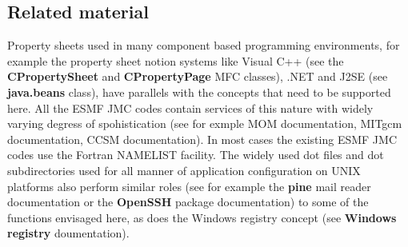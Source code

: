 \subsection{Related material}
 Property sheets used in many component based programming environments, for example
the property sheet notion  systems like Visual C++ (see the {\bf CPropertySheet} and
{\bf CPropertyPage} MFC classes), .NET and J2SE (see {\bf java.beans} class), have parallels with the concepts that need to 
be supported here. All the ESMF JMC codes contain services of this nature with widely 
varying degress of spohistication (see for exmple MOM documentation, MITgcm documentation, CCSM documentation). 
In most cases the existing ESMF JMC codes use the Fortran NAMELIST facility. The 
widely used dot files and dot subdirectories used for all manner of application configuration on UNIX 
platforms also perform similar roles (see for example the {\bf pine} mail reader
documentation or the {\bf OpenSSH} package documentation) to some of the functions envisaged here, as does the Windows 
registry concept (see {\bf Windows registry} doumentation).



